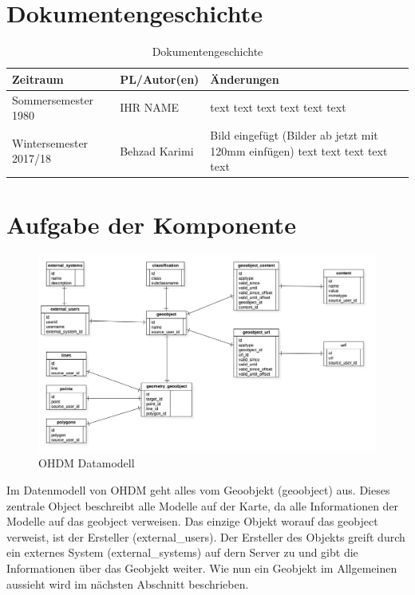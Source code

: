 \section{Dokumentengeschichte}
\begin{table}[h]
 \begin{tabular}{|l|l|p{4cm}|}
 \hline
 Zeitraum & PL/Autor(en) & Änderungen \\
 \hline
 Sommersemester 1980 & IHR NAME & 
text \newline 
text \newline 
text \newline 
text \newline 
text \newline 
text \newline 
 
  \\
 \hline
 Wintersemester 2017/18 & Behzad Karimi & 
Bild eingefügt (Bilder ab jetzt mit 120mm einfügen) \newline 
text \newline 
text \newline 
text \newline 
text \newline 
text \newline 
 
  \\
 \hline
 \end{tabular}
 \caption{Dokumentengeschichte}
 \end{table}

\section{Aufgabe der Komponente}
\begin{figure}[h!]
\centering
\includegraphics[width=127mm]{ohdm_datenmodell/ohdm_data_modell.png}
\caption{OHDM Datamodell}
\label{fig:datamodell}
\end{figure}
Im Datenmodell von OHDM geht alles vom Geoobjekt (geoobject) aus. Dieses zentrale Object beschreibt alle Modelle auf der Karte, da alle Informationen der Modelle auf das geobject verweisen. Das einzige Objekt worauf das geobject verweist, ist der Ersteller (external\_users). Der Ersteller des Objekts greift durch ein externes System (external\_systems) auf dern Server zu und gibt die Informationen über das Geobjekt weiter. Wie nun ein Geobjekt im Allgemeinen aussieht wird im nächsten Abschnitt beschrieben.

